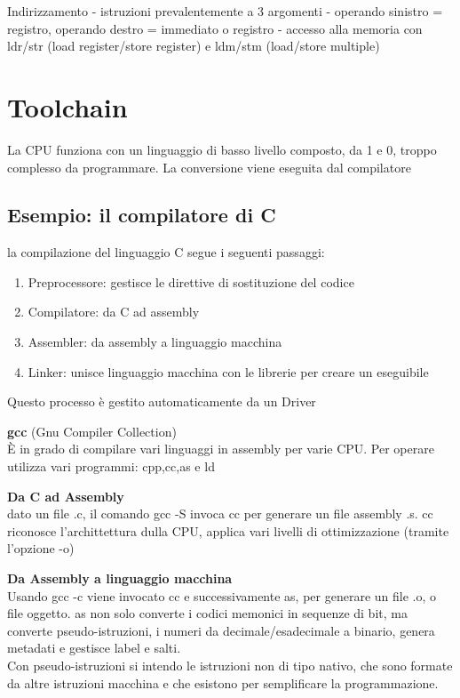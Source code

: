 \documentclass[12pt, a4paper]{article}
\begin{document}
Indirizzamento
- istruzioni prevalentemente a 3 argomenti
 - operando sinistro = registro, operando destro = immediato o registro
- accesso alla memoria con ldr/str (load register/store register) e ldm/stm (load/store multiple)




\newpage
\thispagestyle{fancy}
\section{Toolchain}
La CPU funziona con un linguaggio di basso livello composto, da 1 e 0, troppo complesso da programmare. La conversione
viene eseguita dal compilatore

\subsection{Esempio: il compilatore di C}
la compilazione del linguaggio C segue i seguenti passaggi:
\begin{enumerate}
  \item Preprocessore: gestisce le direttive di sostituzione del codice
  \item Compilatore: da C ad assembly 
  \item Assembler: da assembly a linguaggio macchina
  \item Linker: unisce linguaggio macchina con le librerie per creare un eseguibile
\end{enumerate}
Questo processo è gestito automaticamente da un Driver

\textbf{gcc} (Gnu Compiler Collection)\\ È in grado di compilare vari linguaggi in assembly per varie CPU. Per 
operare utilizza vari programmi: cpp,cc,as e ld 

\textbf{Da C ad Assembly}\\ dato un file .c, il comando gcc -S invoca cc per generare un file assembly .s.
cc riconosce l'archittettura dulla CPU, applica vari livelli di ottimizzazione (tramite l'opzione -o)

\textbf{Da Assembly a linguaggio macchina}\\ Usando gcc -c viene invocato cc e successivamente as, per generare un
file .o, o file oggetto. as non solo converte i codici memonici in sequenze di bit, ma converte pseudo-istruzioni,
i numeri da decimale/esadecimale a binario, genera metadati e gestisce label e salti.\\
Con pseudo-istruzioni si intendo le istruzioni non di tipo nativo, che sono formate da altre istruzioni macchina
e che esistono per semplificare la programmazione.
\end{document}
